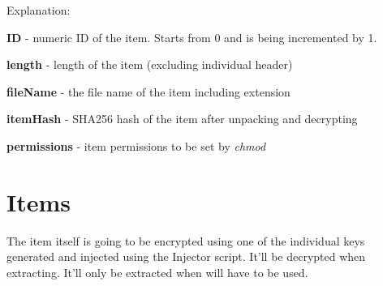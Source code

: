 Explanation:

\textbf{ID} - numeric ID of the item. Starts from 0 and is being incremented by 1.

\textbf{length} - length of the item (excluding individual header)

\textbf{fileName} - the file name of the item including extension 

\textbf{itemHash} - SHA256 hash of the item after unpacking and decrypting

\textbf{permissions} - item permissions to be set by \emph{chmod}

\section{Items}
The item itself is going to be encrypted using one of the individual keys generated and injected using the Injector script. It'll be decrypted when extracting. It'll only be extracted when will have to be used.
